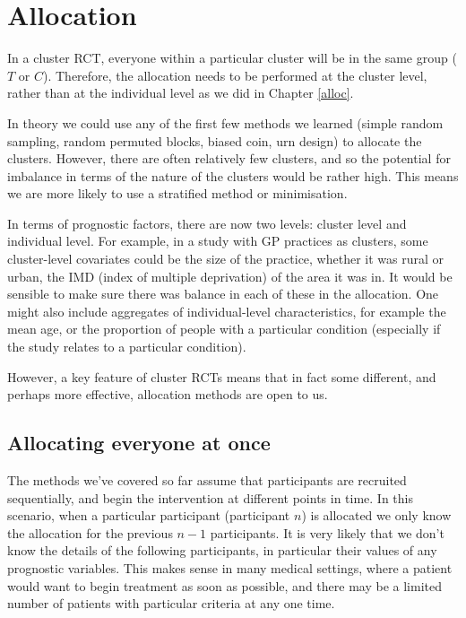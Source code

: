 \documentclass[
  openany]{book}
\theoremstyle{definition}
\theoremstyle{definition}
\theoremstyle{definition}
\theoremstyle{definition}
\theoremstyle{remark}
\begin{document}
\section{Allocation}\label{allocation}

In a cluster RCT, everyone within a particular cluster will be in the same group (\(T\) or \(C\)). Therefore, the allocation needs to be performed at the cluster level, rather than at the individual level as we did in Chapter \ref{alloc}.

In theory we could use any of the first few methods we learned (simple random sampling, random permuted blocks, biased coin, urn design) to allocate the clusters. However, there are often relatively few clusters, and so the potential for imbalance in terms of the nature of the clusters would be rather high. This means we are more likely to use a stratified method or minimisation.

In terms of prognostic factors, there are now two levels: cluster level and individual level. For example, in a study with GP practices as clusters, some cluster-level covariates could be the size of the practice, whether it was rural or urban, the IMD (index of multiple deprivation) of the area it was in. It would be sensible to make sure there was balance in each of these in the allocation. One might also include aggregates of individual-level characteristics, for example the mean age, or the proportion of people with a particular condition (especially if the study relates to a particular condition).

However, a key feature of cluster RCTs means that in fact some different, and perhaps more effective, allocation methods are open to us.

\subsection{Allocating everyone at once}\label{allocating-everyone-at-once}

The methods we've covered so far assume that participants are recruited sequentially, and begin the intervention at different points in time. In this scenario, when a particular participant (participant \(n\)) is allocated we only know the allocation for the previous \(n-1\) participants. It is very likely that we don't know the details of the following participants, in particular their values of any prognostic variables. This makes sense in many medical settings, where a patient would want to begin treatment as soon as possible, and there may be a limited number of patients with particular criteria at any one time.
\end{document}

